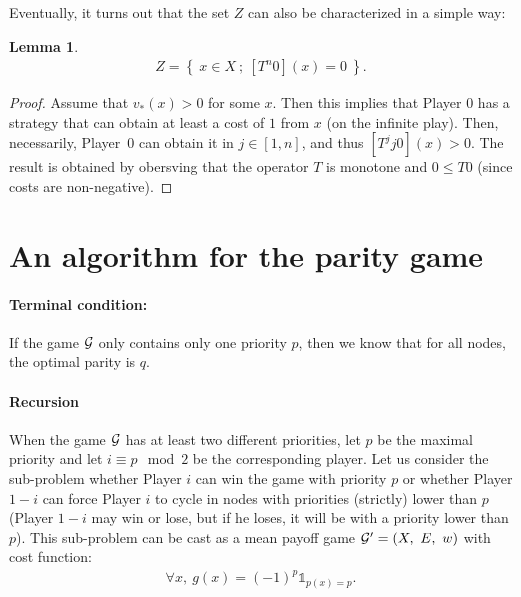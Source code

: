 \documentclass{article}
\newtheorem{lemma}{Lemma}
\def\1{{\mathds 1}}
\def\G{{\cal G}}
\def\pa{Player~0}
\begin{document}
Eventually, it turns out that the set $Z$ can also be characterized in a simple way:
\begin{lemma}
  \begin{align}
    Z = \left\{~ x \in X ~;~ [T^n 0](x) = 0 ~\right\}.
  \end{align}
\end{lemma}
\begin{proof}
Assume that $v_*(x)>0$ for some $x$. Then this implies that Player 0 has a strategy that can obtain at least a cost of $1$ from $x$ (on the infinite play). Then, necessarily, \pa{ }can obtain it in $j \in [1,n]$, and thus $[T^jj 0](x)>0$. The result is obtained by obersving that the operator $T$ is monotone and $0 \le T 0$ (since costs are non-negative).
\end{proof}

\section{An algorithm for the parity game}

\paragraph{Terminal condition:} If the game $\G$ only contains only one priority $p$, then we know that for all nodes, the optimal parity is $q$.
\paragraph{Recursion} When the game $\G$ has at least two different priorities, let $p$ be the maximal priority and let $i \equiv p \mod 2$ be the corresponding player. 
Let us consider the sub-problem whether Player $i$ can win the game with priority $p$ or whether Player $1-i$ can force Player $i$ to cycle in nodes with priorities (strictly) lower than $p$ (Player $1-i$ may win or lose, but if he loses, it will be with a priority lower than $p$). This sub-problem can be cast as a mean payoff game $\G'=(X,~ E,~ w)$ with cost function:
\begin{align}
  \forall x,~ g(x) = (-1)^p \1_{p(x)=p}.
\end{align}
\end{document}

